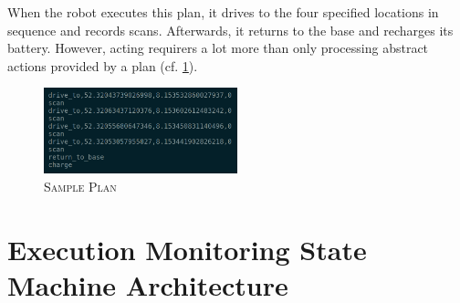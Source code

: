 \documentclass[english, master, utf8]{base/thesis_KBS}
\begin{document}
When the robot executes this plan, it drives to the four specified locations in sequence and records scans.
Afterwards, it returns to the base and recharges its battery. However, acting requirers a lot more than only processing abstract actions provided by a plan (cf. 
\ref{sec:execution_monitoring_smach_architecture}). \cite{Ingrand:2017}
\begin{figure}[H]
    \centering
    \includegraphics[width=0.5\textwidth]{pics/plan_example.png}
    \caption{\textsc{Sample Plan}}
    \label{fig:plan_example}
\end{figure}
\noindent

\section{Execution Monitoring State Machine Architecture}
\label{sec:execution_monitoring_smach_architecture}
\end{document}
